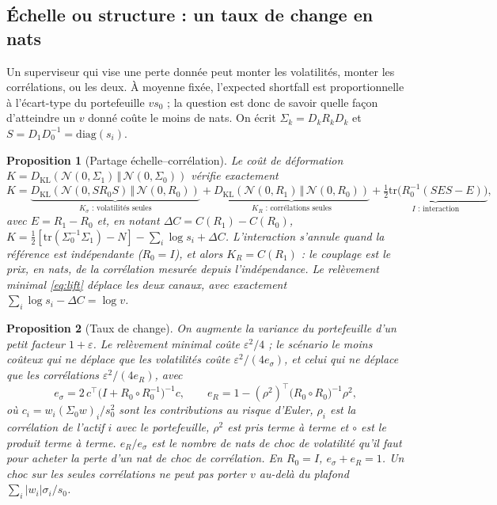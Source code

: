 \documentclass[12pt]{article}
\newtheorem{proposition}{Proposition}
\theoremstyle{definition}
\newcommand{\KL}[2]{D_{\mathrm{KL}}\!\left(#1\,\Vert\,#2\right)}
\begin{document}
\begin{doublespace}
\subsection{Échelle ou structure : un taux de change en nats}

Un superviseur qui vise une perte donnée peut monter les volatilités, monter
les corrélations, ou les deux. À moyenne fixée, l'expected shortfall est
proportionnelle à l'écart-type du portefeuille $vs_0$ ; la question est donc
de savoir quelle façon d'atteindre un $v$ donné coûte le moins de nats. On
écrit $\Sigma_k=D_kR_kD_k$ et $S=D_1D_0^{-1}=\mathrm{diag}(s_i)$.

\begin{proposition}[Partage échelle--corrélation]
\label{prop:split}
Le coût de déformation $K=\KL{\mathcal N(0,\Sigma_1)}{\mathcal N(0,\Sigma_0)}$
vérifie exactement
\begin{equation}
\label{eq:split}
K=\underbrace{\KL{\mathcal N(0,SR_0S)}{\mathcal N(0,R_0)}}_{K_\sigma\text{ : volatilités seules}}
+\underbrace{\KL{\mathcal N(0,R_1)}{\mathcal N(0,R_0)}}_{K_R\text{ : corrélations seules}}
+\underbrace{\tfrac12\mathrm{tr}\bigl(R_0^{-1}(SES-E)\bigr)}_{I\text{ : interaction}},
\end{equation}
avec $E=R_1-R_0$ et, en notant $\Delta C=C(R_1)-C(R_0)$,
$K=\tfrac12[\mathrm{tr}(\Sigma_0^{-1}\Sigma_1)-N]-\sum_i\log s_i+\Delta C$.
L'interaction s'annule quand la référence est indépendante ($R_0=I$), et
alors $K_R=C(R_1)$ : le couplage est le prix, en nats, de la corrélation
mesurée depuis l'indépendance. Le relèvement minimal \eqref{eq:lift} déplace
les deux canaux, avec exactement $\sum_i\log s_i-\Delta C=\log v$.
\end{proposition}

\begin{proposition}[Taux de change]
\label{prop:rate}
On augmente la variance du portefeuille d'un petit facteur $1+\varepsilon$. Le
relèvement minimal coûte $\varepsilon^2/4$ ; le scénario le moins coûteux qui
ne déplace que les volatilités coûte $\varepsilon^2/(4e_\sigma)$, et celui qui
ne déplace que les corrélations $\varepsilon^2/(4e_R)$, avec
\begin{equation}
\label{eq:rate}
e_\sigma=2\,c^\top\bigl(I+R_0\circ R_0^{-1}\bigr)^{-1}c,\qquad
e_R=1-(\rho^{2})^\top\bigl(R_0\circ R_0\bigr)^{-1}\rho^{2},
\end{equation}
où $c_i=w_i(\Sigma_0w)_i/s_0^2$ sont les contributions au risque d'Euler,
$\rho_i$ est la corrélation de l'actif $i$ avec le portefeuille, $\rho^2$ est
pris terme à terme et $\circ$ est le produit terme à terme. $e_R/e_\sigma$ est
le nombre de nats de choc de volatilité qu'il faut pour acheter la perte d'un
nat de choc de corrélation. En $R_0=I$, $e_\sigma+e_R=1$. Un choc sur les
seules corrélations ne peut pas porter $v$ au-delà du plafond
$\sum_i|w_i|\sigma_i/s_0$.
\end{proposition}


\end{doublespace}
\end{document}
